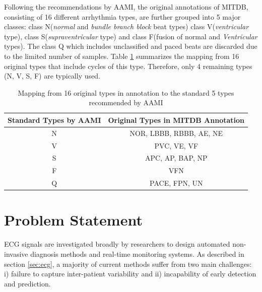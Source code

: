 Following the recommendations by AAMI, the original annotations of MITDB, consisting of 16 different arrhythmia types, are further grouped into 5 major classes: class N(\textit{normal} and \textit{bundle branch block} beat types) class V(\textit{ventricular} type), class S(\textit{supraventricular} type) and class F(fusion of normal and \textit{Ventricular} types). The class Q which includes unclassified and paced beats are discarded due to the limited number of samples. Table \ref{table:grouping_types} summarizes the mapping from 16 original types that include cycles of this type. Therefore, only 4 remaining types (N, V, S, F) are typically used.%

\begin{table}[h]
\centering
\caption{Mapping from 16 original types in annotation to the standard 5 types recommended by AAMI}
\label{table:grouping_types}
\begin{tabular}{|c|c|}
\hline
Standard Types by AAMI & Original Types in MITDB Annotation \\ \hline
N                      & NOR, LBBB, RBBB, AE, NE            \\ \hline
V                      & PVC, VE, VF                        \\ \hline
S                      & APC, AP, BAP, NP                   \\ \hline
F                      & VFN                                \\ \hline
Q                      & PACE, FPN, UN                      \\ \hline
\end{tabular}
\end{table}




\section{Problem Statement}

ECG signals are investigated broadly by researchers to design automated non-invasive diagnosis methods and real-time monitoring systems\cite{Kiranyaz, chen2018predictive, jchen}. As described in section \ref{sec:ecg}, a majority of current methods suffer from two main challenges: i) failure to capture inter-patient variability and ii) incapability of early detection and prediction. %

